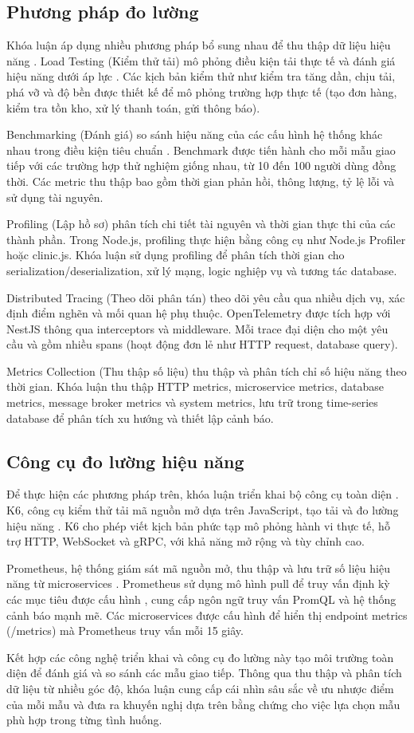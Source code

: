 \subsection{Phương pháp đo lường}
Khóa luận áp dụng nhiều phương pháp bổ sung nhau để thu thập dữ liệu hiệu năng \cite{newman2015}. Load Testing (Kiểm thử tải) mô phỏng điều kiện tải thực tế và đánh giá hiệu năng dưới áp lực \cite{jun2018}. Các kịch bản kiểm thử như kiểm tra tăng dần, chịu tải, phá vỡ và độ bền được thiết kế để mô phỏng trường hợp thực tế (tạo đơn hàng, kiểm tra tồn kho, xử lý thanh toán, gửi thông báo).

Benchmarking (Đánh giá) so sánh hiệu năng của các cấu hình hệ thống khác nhau trong điều kiện tiêu chuẩn \cite{richardson2019}. Benchmark được tiến hành cho mỗi mẫu giao tiếp với các trường hợp thử nghiệm giống nhau, từ 10 đến 100 người dùng đồng thời. Các metric thu thập bao gồm thời gian phản hồi, thông lượng, tỷ lệ lỗi và sử dụng tài nguyên.

Profiling (Lập hồ sơ) phân tích chi tiết tài nguyên và thời gian thực thi của các thành phần. Trong Node.js, profiling thực hiện bằng công cụ như Node.js Profiler hoặc clinic.js. Khóa luận sử dụng profiling để phân tích thời gian cho serialization/deserialization, xử lý mạng, logic nghiệp vụ và tương tác database.

Distributed Tracing (Theo dõi phân tán) theo dõi yêu cầu qua nhiều dịch vụ, xác định điểm nghẽn và mối quan hệ phụ thuộc. OpenTelemetry được tích hợp với NestJS thông qua interceptors và middleware. Mỗi trace đại diện cho một yêu cầu và gồm nhiều spans (hoạt động đơn lẻ như HTTP request, database query).

Metrics Collection (Thu thập số liệu) thu thập và phân tích chỉ số hiệu năng theo thời gian. Khóa luận thu thập HTTP metrics, microservice metrics, database metrics, message broker metrics và system metrics, lưu trữ trong time-series database để phân tích xu hướng và thiết lập cảnh báo.

\subsection{Công cụ đo lường hiệu năng}
Để thực hiện các phương pháp trên, khóa luận triển khai bộ công cụ toàn diện \cite{aksakalli2021}. K6, công cụ kiểm thử tải mã nguồn mở dựa trên JavaScript, tạo tải và đo lường hiệu năng \cite{jun2018}. K6 cho phép viết kịch bản phức tạp mô phỏng hành vi thực tế, hỗ trợ HTTP, WebSocket và gRPC, với khả năng mở rộng và tùy chỉnh cao.

Prometheus, hệ thống giám sát mã nguồn mở, thu thập và lưu trữ số liệu hiệu năng từ microservices \cite{richardson2019}. Prometheus sử dụng mô hình pull để truy vấn định kỳ các mục tiêu được cấu hình \cite{newman2015}, cung cấp ngôn ngữ truy vấn PromQL và hệ thống cảnh báo mạnh mẽ. Các microservices được cấu hình để hiển thị endpoint metrics (/metrics) mà Prometheus truy vấn mỗi 15 giây.

Kết hợp các công nghệ triển khai và công cụ đo lường này tạo môi trường toàn diện để đánh giá và so sánh các mẫu giao tiếp. Thông qua thu thập và phân tích dữ liệu từ nhiều góc độ, khóa luận cung cấp cái nhìn sâu sắc về ưu nhược điểm của mỗi mẫu và đưa ra khuyến nghị dựa trên bằng chứng cho việc lựa chọn mẫu phù hợp trong từng tình huống.